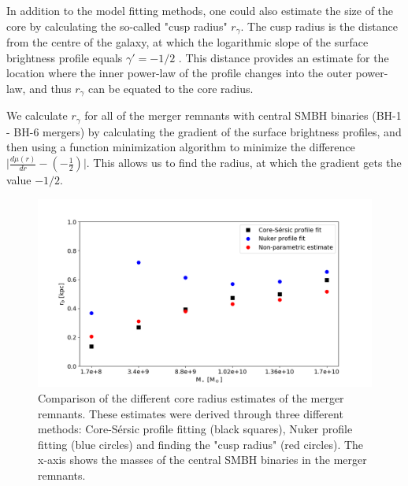 \documentclass[english, oneside]{HYgradu}
\begin{document}
In addition to the model fitting methods, one could also estimate the size of the core by calculating the so-called "cusp radius" $r_\gamma$. The cusp radius is the distance from the centre of the galaxy, at which the logarithmic slope of the surface brightness profile equals $\gamma' = -1/2$ \citep{Carollo1997, Lauer2007Cusp}. This distance provides an estimate for the location where the inner power-law of the profile changes into the outer power-law, and thus $r_\gamma$ can be equated to the core radius. 

We calculate $r_\gamma$ for all of the merger remnants with central SMBH binaries (BH-1 - BH-6 mergers) by calculating the gradient of the surface brightness profiles, and then using a function minimization algorithm \citep{NelderMead} to minimize the difference $\big| \frac{d\mu(r)}{dr} - \left( - \frac{1}{2} \right) \big|$. This allows us to find the radius, at which the gradient gets the value $-1/2$. 

\begin{figure}[h]
	\centering
	\includegraphics[width=\textwidth]{rb_mass_relation.png}
	\caption{Comparison of the different core radius estimates of the merger remnants. These estimates were derived through three different methods: Core-Sérsic profile fitting (black squares), Nuker profile fitting (blue circles) and  finding the "cusp radius" (red circles). The x-axis shows the masses of the central SMBH binaries in the merger remnants.}
	\label{figure:radii_comparison}
\end{figure}
\end{document}
